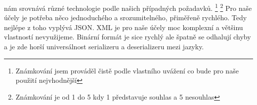 nám srovnává různé technologie podle našich případných požadavků. \footnote[1]{Známkování jsem prováděl čistě podle vlastního uvážení co bude pro naše použití nejvhodnější} \footnote[2]{Známkování je od 1 do 5 kdy 1 představuje souhlas a 5 nesouhlas} Pro naše účely je potřeba něco jednoduchého a srozumitelného, přiměřeně rychlého. Tedy nejlépe z toho vyplývá JSON. XML je pro naše účely moc komplexní a většinu vlastností nevyužijeme. Binární formát je sice rychlý ale špatně se odhalují chyby a je zde horší universálnost serializeru a deserializeru mezi jazyky.


\endinput